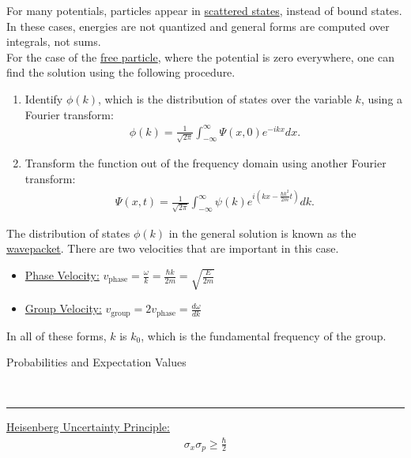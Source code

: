 \documentclass{article}
\newcommand{\header}[1]{\begin{large}\noindent #1\end{large}\\\rule{\textwidth}{0.5pt}}
\newcommand{\gap}{\medskip\\}
\newcommand{\sheader}[1]{\underline{#1:}}
\newcommand{\ds}{\displaystyle}
\begin{document}
    For many potentials, particles appear in \underline{scattered states},
    instead of bound states. In these cases, energies are not quantized
    and general forms are computed over integrals, not sums.
    \gap
    For the case of the \underline{free particle}, where the 
    potential is zero everywhere, one can find the solution using the
    following procedure.
    \begin{enumerate}
        \item Identify $\phi(k)$, which is the distribution of states 
        over the variable $k$, using a Fourier transform:
        \begin{align*}
            \phi(k) = \frac{1}{\sqrt{2\pi}} \int_{-\infty}^{\infty}\Psi(x, 0)e^{-ikx}dx.
        \end{align*}
        \item Transform the function out of the frequency domain using 
        another Fourier transform:
        \begin{align*}
            \Psi(x,t) = \frac{1}{\sqrt{2\pi}}\int_{-\infty}^{\infty} \psi(k) e^{i\left(kx - \frac{\hbar k^2}{2m}t\right)} dk.
        \end{align*}
    \end{enumerate}

    The distribution of states $\phi(k)$ in the general solution is known 
    as the \underline{wavepacket}. There are two velocities that are important
    in this case.
    \begin{itemize}
        \item \sheader{Phase Velocity} $\ds v_\textrm{phase} = \frac{\omega}{k} = \frac{\hbar k}{2m} = \sqrt{\frac{E}{2m}}$
        \item \sheader{Group Velocity} $\ds v_\textrm{group} = 2v_\textrm{phase} = \frac{d\omega}{dk}$
    \end{itemize}
    In all of these forms, $k$ is $k_0$, which is the fundamental 
    frequency of the group.
    \gap

    \header{Probabilities and Expectation Values}
    \sheader{Heisenberg Uncertainty Principle}
    \begin{align*}
        \sigma_x \sigma_p \geq \frac{\hbar}{2}
    \end{align*}
\end{document}

